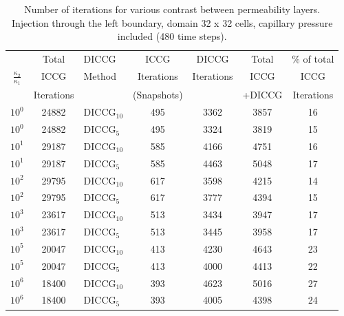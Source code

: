 \documentclass[12pt]{article}
\begin{document}
{\begin{table}[!h]\centering
\begin{minipage}{1\textwidth}
 \centering
\begin{tabular}{ ||c|c||l|c|c|c|c||} 
\hline
&Total& DICCG & ICCG&DICCG &Total&\% of total\\ 
         $\frac{\kappa_2}{\kappa_1}$  & ICCG       & Method & Iterations & Iterations&ICCG& ICCG\\ 
                           &  Iterations&        &  (Snapshots)   & &+DICCG&Iterations \\
\hline    
$10^{0}$ &24882& DICCG$_{10}$&495&3362&3857&16 \\ 
\hline  
$10^{0}$ &24882& DICCG$_{5}$&495&3324&3819&15 \\ 
\hline  
$10^{1}$ &29187& DICCG$_{10}$&585&4166&4751&16 \\ 
\hline  
$10^{1}$ &29187& DICCG$_{5}$&585&4463&5048&17 \\ 
\hline 
$10^{2}$ &29795& DICCG$_{10}$&617&3598&4215&14 \\ 
\hline  
$10^{2}$ &29795& DICCG$_{5}$&617&3777&4394&15 \\ 
\hline  
$10^{3}$ &23617& DICCG$_{10}$&513&3434&3947&17 \\ 
\hline  
$10^{3}$ &23617& DICCG$_{5}$&513&3445&3958&17 \\ 
\hline  
$10^{5}$ &20047& DICCG$_{10}$&413&4230&4643&23 \\ 
\hline  
$10^{5}$ &20047& DICCG$_{5}$&413&4000&4413&22 \\ 
\hline  
$10^{6}$ &18400& DICCG$_{10}$&393&4623&5016&27 \\ 
\hline  
$10^{6}$ &18400& DICCG$_{5}$&393&4005&4398&24 \\ 
\hline  
\end{tabular} 
\caption{Number of iterations for various contrast between permeability layers. Injection through the left boundary, domain 32 x 32 cells, capillary pressure included (480 time steps).}\label{table:liter1a_2} 
\end{minipage}  
\end{table}  







  


}
\end{document}
